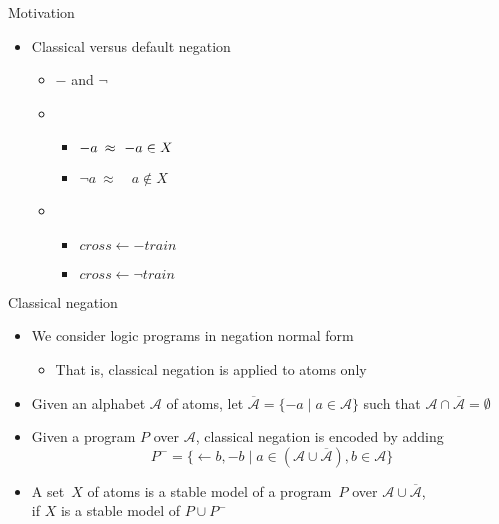 \begin{frame}[c]{Motivation}
  \begin{itemize}
    \item Classical versus default negation
          \bigskip
          \begin{itemize}\itemsep 1ex
            \item<1->   $-$ and $\neg$
            \item<2-> 
                  \begin{itemize}
                    \item $\rlap{${-a}$}\phantom{{\neg a}}\ \approx\ {-a}   \in X$
                    \item ${\neg a}\ \approx   \quad a\notin X$
                  \end{itemize}
            \item<3-> 
                  \begin{itemize}
                    \item $\mathit{cross}\leftarrow{-\mathit{train}}$
                    \item $\mathit{cross}\leftarrow{\neg \mathit{train}}$
                  \end{itemize}
          \end{itemize}
  \end{itemize}
\end{frame}
\begin{frame}{Classical negation}
  \begin{itemize}
    \item<1-3> We consider logic programs in negation normal form
          \begin{itemize}
            \item That is, classical negation is applied to atoms only
          \end{itemize}
    \item<2-> Given an alphabet $\mathcal{A}$ of atoms,
          let $\overline{\mathcal{A}}=\{{-a}\mid a\in\mathcal{A}\}$
          such that $\mathcal{A}\cap\overline{\mathcal{A}}=\emptyset$
    \item<3-> Given a program $P$ over $\mathcal{A}$, classical negation is encoded by adding
          \[
            P^-
            =
            \{ \leftarrow b,{-b} \mid a\in(\mathcal{A}\cup\overline{\mathcal{A}}), b\in \mathcal{A}\}
          \]
          \smallskip
    \item<4->
          A set~$X$ of atoms is a \alert{stable model} of a program~$P$
          over $\mathcal{A}\cup\overline{\mathcal{A}}$,
          \\
          if
          $X$ is a stable model of $P\cup P^-$
  \end{itemize}
\end{frame}
